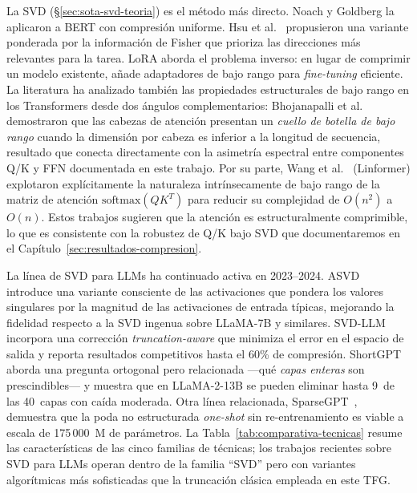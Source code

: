 La SVD (\S\ref{sec:sota-svd-teoria}) es el método más directo. Noach y Goldberg
\cite{noach2020compressing} la aplicaron a BERT con compresión uniforme. Hsu et al.\
\cite{hsu2022language} propusieron una variante ponderada por la información de
Fisher que prioriza las direcciones más relevantes para la tarea. LoRA
\cite{hu2022lora} aborda el problema inverso: en lugar de comprimir un modelo
existente, añade adaptadores de bajo rango para \emph{fine-tuning} eficiente. La
literatura ha analizado también las propiedades estructurales de bajo rango en
los Transformers desde dos ángulos complementarios: Bhojanapalli et
al.~\cite{bhojanapalli2020low} demostraron que las cabezas de atención presentan
un \emph{cuello de botella de bajo rango} cuando la dimensión por cabeza es
inferior a la longitud de secuencia, resultado que conecta directamente con la
asimetría espectral entre componentes Q/K y FFN documentada en este trabajo. Por su parte,
Wang et al.~\cite{wang2020linformer} (Linformer) explotaron explícitamente la
naturaleza intrínsecamente de bajo rango de la matriz de atención
$\text{softmax}(QK^T)$ para reducir su complejidad de $O(n^2)$ a $O(n)$. Estos
trabajos sugieren que la atención es estructuralmente comprimible, lo que es
consistente con la robustez de Q/K bajo SVD que documentaremos en el
Capítulo~\ref{sec:resultados-compresion}.

La línea de SVD para LLMs ha continuado activa en 2023--2024.
ASVD~\cite{yuan2023asvd} introduce una variante consciente de las
activaciones que pondera los valores singulares por la magnitud de las
activaciones de entrada típicas, mejorando la fidelidad respecto a la
SVD ingenua sobre LLaMA-7B y similares. SVD-LLM~\cite{wang2024svdllm}
incorpora una corrección \emph{truncation-aware} que minimiza el error
en el espacio de salida y reporta resultados competitivos hasta el 60\%
de compresión. ShortGPT~\cite{men2024shortgpt} aborda una pregunta
ortogonal pero relacionada ---qué \emph{capas enteras} son
prescindibles--- y muestra que en LLaMA-2-13B se pueden eliminar hasta
9~de las 40~capas con caída moderada. Otra línea relacionada,
SparseGPT~\cite{frantar2023sparsegpt}, demuestra que la poda no
estructurada \emph{one-shot} sin re-entrenamiento es viable a escala
de 175\,000~M de parámetros. La Tabla~\ref{tab:comparativa-tecnicas}
resume las características de las cinco familias de técnicas; los
trabajos recientes sobre SVD para LLMs operan dentro de la familia
``SVD'' pero con variantes algorítmicas más sofisticadas que la
truncación clásica empleada en este TFG.

